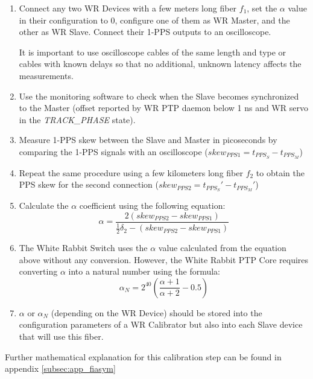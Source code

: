 \begin{enumerate}
	\item Connect any two WR Devices with a few meters long fiber $f_1$, set
		the $\alpha$ value in their configuration to 0, configure one of them as WR
		Master, and the other as WR Slave. Connect their 1-PPS outputs to an
		oscilloscope. 
		
		It is important to use oscilloscope cables of the same length
		and type or cables with known delays so that no additional,
		unknown latency affects the measurements.

	\item Use the monitoring software to check when the Slave becomes
		synchronized to the Master (offset reported by WR PTP daemon below 
		1 ns and WR servo in the \emph{TRACK\_PHASE} state).

	\item Measure 1-PPS skew between the Slave and Master in picoseconds by
		comparing the 1-PPS signals with an oscilloscope ($skew_{PPS1} 
		= t_{PPS_S} - t_{PPS_M}$)

	\item Repeat the same procedure using a few kilometers long fiber $f_2$ to
		obtain the PPS skew for the second connection ($skew_{PPS2} =
		t_{PPS_S}' - t_{PPS_M}'$)

	\item Calculate the $\alpha$ coefficient using the following equation:
		\begin{equation}
			\alpha = \frac{2(skew_{PPS2} -
			skew_{PPS1})}{\frac{1}{2}\delta_2 -
			(skew_{PPS2}-skew_{PPS1})}
		\end{equation}

  \item The White Rabbit Switch uses the $\alpha$ value calculated from the equation
    above without any conversion. However, the White Rabbit PTP Core requires
    converting $\alpha$ into a natural number using the formula:
    \begin{equation}
      \alpha_N = 2^{40}(\frac{\alpha+1}{\alpha+2} - 0.5)
    \end{equation}

  \item $\alpha$ or $\alpha_N$ (depending on the WR Device) should be stored
		into the configuration parameters of a WR Calibrator but also into
		each Slave device that will use this fiber.
\end{enumerate}

Further mathematical explanation for this calibration step can be found in
appendix \ref{subsec:app_fiasym}

